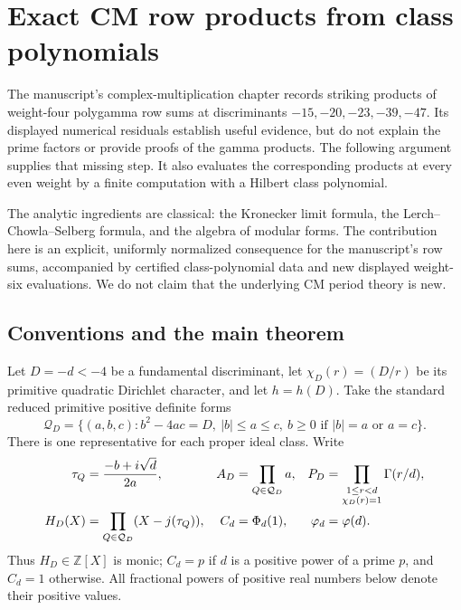 
\section{Exact CM row products from class polynomials}
\label{cmnorm:sec:main}

The manuscript's complex-multiplication chapter records striking products
of weight-four polygamma row sums at discriminants $-15,-20,-23,-39,-47$.
Its displayed numerical residuals establish useful evidence, but do not
explain the prime factors or provide proofs of the gamma products.
The following argument supplies that missing step. It also evaluates
the corresponding products at every even weight by a finite computation
with a Hilbert class polynomial.

The analytic ingredients are classical: the Kronecker limit formula,
the Lerch--Chowla--Selberg formula, and the algebra of modular forms.
The contribution here is an explicit, uniformly normalized consequence
for the manuscript's row sums, accompanied by certified class-polynomial
data and new displayed weight-six evaluations. We do not claim that the
underlying CM period theory is new.

\subsection{Conventions and the main theorem}

Let $D=-d<-4$ be a fundamental discriminant, let
$\chi_D(r)=(D/r)$ be its primitive quadratic Dirichlet character,
and let $h=h(D)$. Take the standard reduced primitive positive definite
forms
\[
 \mathcal Q_D=\{(a,b,c):b^2-4ac=D,\ |b|\leq a\leq c,\
 b\geq0\text{ if }|b|=a\text{ or }a=c\}.
\]
There is one representative for each proper ideal class. Write
\begin{align}
 \tau_Q&=\frac{-b+i\sqrt d}{2a},&
 A_D&=\prod_{Q\in\mathcal Q_D}a,&
 P_D&=\prod_{\substack{1\leq r<d\\\chi_D(r)=1}}
       \Gamma(r/d),\label{cmnorm:eq:data}\\
 H_D(X)&=\prod_{Q\in\mathcal Q_D}(X-j(\tau_Q)),&
 C_d&=\Phi_d(1),&\varphi_d&=\varphi(d).\notag
\end{align}
Thus $H_D\in\mathbb Z[X]$ is monic; $C_d=p$ if $d$ is a positive
power of a prime $p$, and $C_d=1$ otherwise. All fractional powers of
positive real numbers below denote their positive values.

